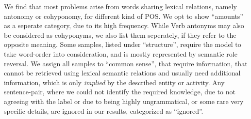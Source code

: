 We find that most problems arise from words sharing lexical relations, namely antonomy or cohyponomy, for different kind of \ac{POS}. We opt to show ``amounts'' as a seperate category, due to its high frequency. While Verb antonyms may also be considered as cohyponyms, we also list them seperately, if they refer to the opposite meaning. Some samples, listed under ``structure'', require the model to take word-order into consideration, and is mostly represented by semantic role reversal. We assign all samples to ``common sense'', that require information, that cannot be retrieved using lexical semantic relations and usually need additional information, which is only \textit{implied} by the described entity or activity. Any sentence-pair, where we could not identify the required knowledge, due to not agreeing with the label or due to being highly ungrammatical, or some rare very specific details, are ignored in our results, categorized as ``ignored''.

